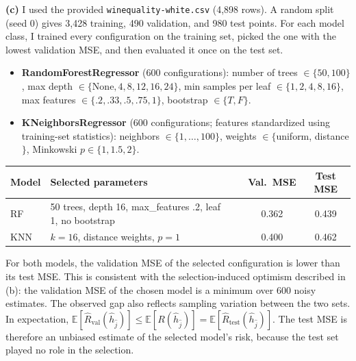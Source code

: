 \documentclass[11pt]{article}
\begin{document}
\textbf{(c)} I used the provided \texttt{winequality-white.csv} (4{,}898 rows). A random split (seed 0) gives 3{,}428 training, 490 validation, and 980 test points. For each model class, I trained every configuration on the training set, picked the one with the lowest validation MSE, and then evaluated it once on the test set.
\begin{itemize}[nosep]
\item \textbf{RandomForestRegressor} (600 configurations): number of trees $\in\{50,100\}$, max depth $\in\{\text{None},4,8,12,16,24\}$, min samples per leaf $\in\{1,2,4,8,16\}$, max features $\in\{.2,.33,.5,.75,1\}$, bootstrap $\in\{T,F\}$.
\item \textbf{KNeighborsRegressor} (600 configurations; features standardized using training-set statistics): neighbors $\in\{1,\dots,100\}$, weights $\in\{$uniform, distance$\}$, Minkowski $p\in\{1,1.5,2\}$.
\end{itemize}
\begin{center}\small
\begin{tabular}{lllcc}
\toprule
Model & Selected parameters && Val.\ MSE & Test MSE\\\midrule
RF & 50 trees, depth 16, max\_features .2, leaf 1, no bootstrap && 0.362 & 0.439\\
KNN & $k=16$, distance weights, $p=1$ && 0.400 & 0.462\\\bottomrule
\end{tabular}
\end{center}
For both models, the validation MSE of the selected configuration is lower than its test MSE. This is consistent with the selection-induced optimism described in (b): the validation MSE of the chosen model is a minimum over 600 noisy estimates. The observed gap also reflects sampling variation between the two sets. In expectation, $\mathbb E[\hat R_{\text{val}}(\hat h_{\hat j})]\le\mathbb E[R(\hat h_{\hat j})]=\mathbb E[\hat R_{\text{test}}(\hat h_{\hat j})]$. The test MSE is therefore an unbiased estimate of the selected model's risk, because the test set played no role in the selection.
\end{document}
